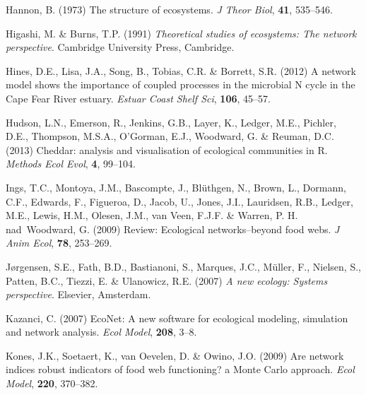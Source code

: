 \documentclass[11pt]{article}
\begin{document}
\begin{thebibliography}{79}
Hannon, B. (1973) The structure of ecosystems.
\newblock \emph{J Theor Biol}, \textbf{41}, 535--546.

Higashi, M. \& Burns, T.P. (1991) \emph{Theoretical studies of ecosystems: The
  network perspective}.
\newblock Cambridge University Press, Cambridge.

Hines, D.E., Lisa, J.A., Song, B., Tobias, C.R. \& Borrett, S.R. (2012) A
  network model shows the importance of coupled processes in the microbial {N}
  cycle in the {Cape Fear River} estuary.
\newblock \emph{Estuar Coast Shelf Sci}, \textbf{106}, 45--57.

Hudson, L.N., Emerson, R., Jenkins, G.B., Layer, K., Ledger, M.E., Pichler,
  D.E., Thompson, M.S.A., O'Gorman, E.J., Woodward, G. \& Reuman, D.C. (2013)
  Cheddar: analysis and visualisation of ecological communities in {R}.
\newblock \emph{Methods Ecol Evol}, \textbf{4}, 99--104.

Ings, T.C., Montoya, J.M., Bascompte, J., Bl{\"u}thgen, N., Brown, L., Dormann,
  C.F., Edwards, F., Figueroa, D., Jacob, U., Jones, J.I., Lauridsen, R.B.,
  Ledger, M.E., Lewis, H.M., Olesen, J.M., van Veen, F.J.F. \& Warren, P. H.
  nad~Woodward, G. (2009) Review: Ecological networks--beyond food webs.
\newblock \emph{J Anim Ecol}, \textbf{78}, 253--269.

J{\o}rgensen, S.E., Fath, B.D., Bastianoni, S., Marques, J.C., M\"{u}ller, F.,
  Nielsen, S., Patten, B.C., Tiezzi, E. \& Ulanowicz, R.E. (2007) \emph{A new
  ecology: Systems perspective}.
\newblock Elsevier, Amsterdam.

Kazanci, C. (2007) Eco{N}et: A new software for ecological modeling, simulation
  and network analysis.
\newblock \emph{Ecol Model}, \textbf{208}, 3--8.

Kones, J.K., Soetaert, K., van Oevelen, D. \& Owino, J.O. (2009) Are network
  indices robust indicators of food web functioning? a {M}onte {C}arlo
  approach.
\newblock \emph{Ecol Model}, \textbf{220}, 370--382.


\end{thebibliography}
\end{document}
